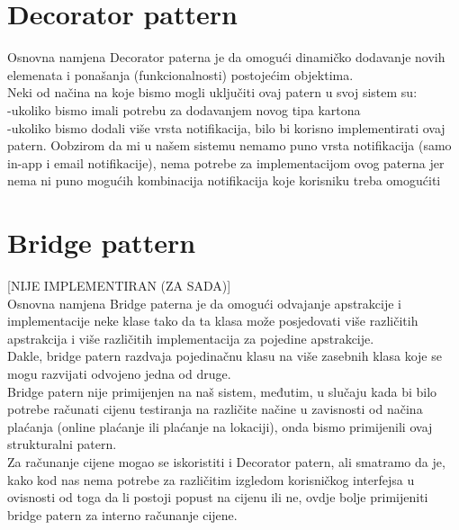 \documentclass{article}
\begin{document}
\section*{Decorator pattern}
\vspace{1mm}
Osnovna namjena Decorator paterna je da omogući dinamičko dodavanje novih elemenata i ponašanja (funkcionalnosti) postojećim objektima.\\Neki od načina na koje bismo mogli uključiti ovaj patern u svoj sistem su:\\
-ukoliko bismo imali potrebu za dodavanjem novog tipa kartona\\
-ukoliko bismo dodali više vrsta notifikacija, bilo bi korisno implementirati ovaj patern. Oobzirom da mi u našem sistemu nemamo puno vrsta notifikacija (samo in-app i email notifikacije), nema potrebe za implementacijom ovog paterna jer nema ni puno mogućih kombinacija notifikacija koje korisniku treba omogućiti\\

\section*{Bridge pattern}
\vspace{1mm}
[NIJE IMPLEMENTIRAN (ZA SADA)]\\
Osnovna namjena Bridge paterna je da omogući odvajanje apstrakcije i implementacije neke klase tako da ta klasa može posjedovati više različitih apstrakcija i više različitih implementacija za pojedine apstrakcije.\\
Dakle, bridge patern razdvaja pojedinačnu klasu na više zasebnih klasa koje se mogu razvijati odvojeno jedna od druge.\\
Bridge patern nije primijenjen na naš sistem, međutim, u slučaju kada bi bilo potrebe računati cijenu testiranja na različite načine u zavisnosti od načina plaćanja (online plaćanje ili plaćanje na lokaciji), onda bismo primijenili ovaj strukturalni patern.\\
Za računanje cijene mogao se iskoristiti i Decorator patern, ali smatramo da je, kako kod nas nema potrebe za različitim izgledom korisničkog interfejsa u ovisnosti od toga da li postoji popust na cijenu ili ne, ovdje bolje primijeniti bridge patern za interno računanje cijene.
\end{document}
